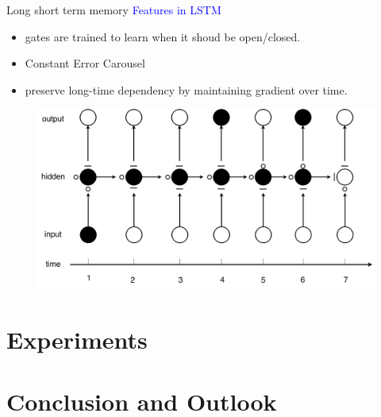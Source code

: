 		\begin{frame}{Long short term memory}
		\textcolor{blue}{\Large Features in LSTM}
		 \begin{itemize}
		  \item gates are trained to learn when it shoud be open/closed. 
		  \item Constant Error Carousel
		  \item preserve long-time dependency by maintaining gradient over time. 
		 \end{itemize}
		 \begin{figure}
		  \includegraphics[width=\textwidth]{LSTMGra.png}
		 \end{figure}


		\end{frame}

\section{Experiments}

\section{Conclusion and Outlook}



